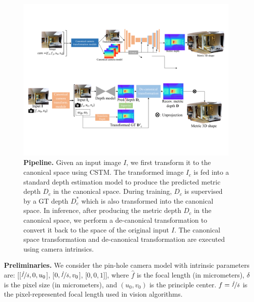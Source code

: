 











\begin{figure}[]
\centering
\includegraphics[width=0.99\textwidth]{./files/pipeline3}
\vspace{-1 em}
\caption{\textbf{Pipeline.} 
Given an input image $I$, we first transform it to the canonical space using CSTM. The transformed image $I_c$ is fed into a standard depth estimation model to produce the predicted metric depth $D_c$ in the canonical space. During training, $D_c$ is supervised by a GT depth $D^*_c$ which is also transformed into the canonical space. In inference, after producing the metric depth $D_c$ in the canonical space, we perform a de-canonical transformation to convert it back to the space of the original input $I$. The canonical space transformation and de-canonical transformation are executed using camera intrinsics.}
\label{fig: pipeline}
\vspace{-1em}
\end{figure}

\noindent\textbf{Preliminaries.}
We consider the pin-hole camera model with intrinsic parameters are:
[[$\nicefrac{\hat{f}}{\delta}, 0, u_{0}$], [$0,  \nicefrac{\hat{f}}{\delta},  v_{0}$], [$0, 0,  1$]],
where $\hat{f}$ is the 
focal length (in micrometers), $\delta$ is the pixel size
(in micrometers), and
$(u_{0}, v_{0})$ is the principle center. $f = \nicefrac{\hat{f}}{\delta}$ is the pixel-represented focal length used in vision algorithms.








